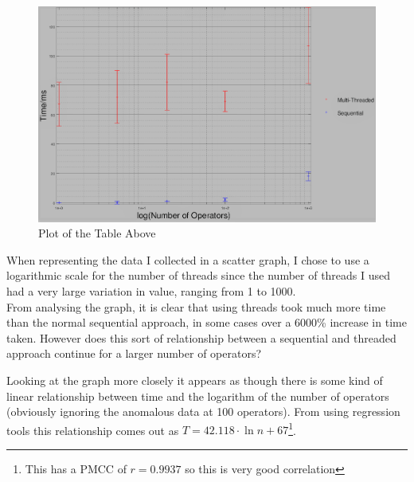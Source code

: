 \documentclass[../../../../../main.tex]{subfiles}
\begin{document}
\begin{figure}[H]
	\begin{center}
		\includegraphics[width=\textwidth]{graphs/plot}
		\caption{Plot of the Table Above}
	\end{center}
\end{figure}
\newpage
\noindent
When representing the data I collected in a scatter graph, I chose to use a logarithmic scale for the number of threads since the number of threads I used had a very large variation in value, ranging from 1 to 1000.\\
From analysing the graph, it is clear that using threads took much more time than the normal sequential approach, in some cases over a 6000\% increase in time taken. However does this sort of relationship between a sequential and threaded approach continue for a larger number of operators?

Looking at the graph more closely it appears as though there is some kind of linear relationship between time and the logarithm of the number of operators (obviously ignoring the anomalous data at 100 operators). From using regression tools this relationship comes out as $T = 42.118\cdot \ln{n} + 67$\footnote{This has a PMCC of $r=0.9937$ so this is very good correlation}.
\end{document}
